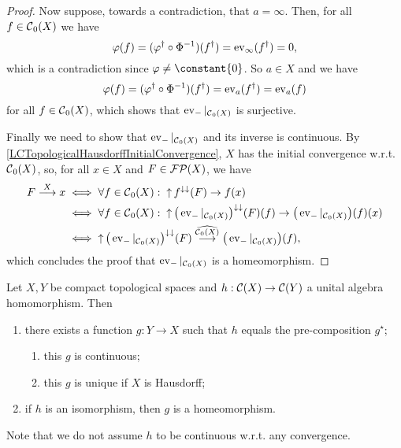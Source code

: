 \begin{proof}
Now suppose, towards a contradiction, that $a = \infty$. Then, for all $f\in \operatorname{\mathcal{C}}_0(X)$ we have
\[ \varphi(f) = (\varphi^\dagger\circ \Phi^{-1})(f^\dagger) = \operatorname{ev}_\infty(f^\dagger) = 0, \]
which is a contradiction since $\varphi \neq \constant{0}$. So $a\in X$ and we have
\[ \varphi(f) = (\varphi^\dagger\circ \Phi^{-1})(f^\dagger) = \operatorname{ev}_a(f^\dagger) = \operatorname{ev}_a(f) \]
for all $f\in \operatorname{\mathcal{C}}_0(X)$, which shows that $\operatorname{ev}_{-}|_{\operatorname{\mathcal{C}}_0(X)}$ is surjective.

Finally we need to show that $\operatorname{ev}_{-}|_{\operatorname{\mathcal{C}}_0(X)}$ and its inverse is continuous. By \ref{LCTopologicalHausdorffInitialConvergence}, $X$ has the initial convergence w.r.t. $\operatorname{\mathcal{C}}_0(X)$, so, for all $x\in X$ and $F\in \operatorname{\mathcal{FP}}(X)$, we have
\begin{align*}
F \overset{X}{\longrightarrow} x &\iff \forall f\in \operatorname{\mathcal{C}}_0(X): \; \operatorname{\uparrow} f^{\downarrow\downarrow}(F)\to f(x) \\
&\iff \forall f\in \operatorname{\mathcal{C}}_0(X): \; \operatorname{\uparrow} \big(\operatorname{ev}_{-}|_{\operatorname{\mathcal{C}}_0(X)}\big)^{\downarrow\downarrow}(F)(f) \to \big(\operatorname{ev}_{-}|_{\operatorname{\mathcal{C}}_0(X)}\big)(f)(x) \\
&\iff \operatorname{\uparrow} \big(\operatorname{ev}_{-}|_{\operatorname{\mathcal{C}}_0(X)}\big)^{\downarrow\downarrow}(F) \overset{\widehat{\operatorname{\mathcal{C}}_0(X)}}{\longrightarrow} \big(\operatorname{ev}_{-}|_{\operatorname{\mathcal{C}}_0(X)}\big)(f),
\end{align*}
which concludes the proof that $\operatorname{ev}_{-}|_{\operatorname{\mathcal{C}}_0(X)}$ is a homeomorphism.
\end{proof}


\begin{proposition}
Let $X,Y$ be compact topological spaces and $h: \operatorname{\mathcal{C}}(X)\to \operatorname{\mathcal{C}}(Y)$ a unital algebra homomorphism. Then
\begin{enumerate}
\item there exists a function $g: Y\to X$ such that $h$ equals the pre-composition $g^\star$;
\begin{enumerate}
\item this $g$ is continuous;
\item this $g$ is unique if $X$ is Hausdorff;
\end{enumerate}
\item if $h$ is an isomorphism, then $g$ is a homeomorphism.
\end{enumerate}
\end{proposition}
Note that we do not assume $h$ to be continuous w.r.t. any convergence.

